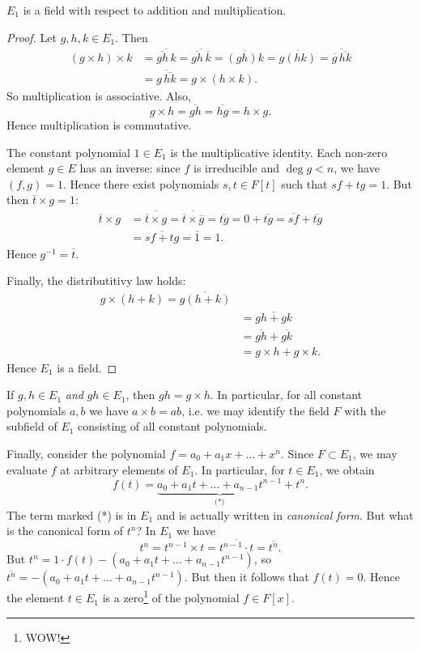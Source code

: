 \begin{proposition}
	$E_1$ is a field with respect to addition and multiplication.
	\begin{proof}
		Let $g, h, k \in E_1$. Then
		\begin{align*}
			(g \times h) \times k &= \overline{\overline{gh}\,k} = \overline{\overline{gh}\,\overline{k}} = \overline{(gh)k} = \overline{g(hk)} = \overline{\overline{g}\,\overline{hk}} \\
					&= \overline{g\,\overline{hk}} = g \times (h \times k).
		\end{align*}
		So multiplication is associative. Also,
		\[
			g \times h = \overline{gh} = \overline{hg} = h \times g.
		\]
		Hence multiplication is commutative.
		
		The constant polynomial $1 \in E_1$ is the multiplicative identity. Each non-zero element $g \in E$ has an inverse: since $f$ is irreducible and $\deg{g} < n$, we have $(f, g) = 1$. Hence there exist polynomials $s, t \in F[t]$ such that $sf + tg = 1$. But then $\overline{t} \times g = 1$:
		\begin{align*}
			\overline{t} \times g &= \overline{\overline{t} \times g} = \overline{\overline{t} \times \overline{g}} = \overline{tg} = 0 + \overline{tg} = \overline{sf} + \overline{tg} \\
					&= \overline{sf + tg} = \overline{1} = 1.
		\end{align*}
		Hence $g^{-1} = \overline{t}$.
		
		Finally, the distributitivy law holds:
		\begin{align*}
			g \times (h + k) = \overline{g(h + k)} \\
					&= \overline{gh + gk} \\
					&= \overline{gh} + \overline{gk} \\
					&= g \times h + g \times k.
		\end{align*}
		Hence $E_1$ is a field.
	\end{proof}
\end{proposition}

\begin{note}
	If $g, h \in E_1$ \emph{and} $gh \in E_1$, then $gh = g \times h$. In particular, for all constant polynomials $a, b$ we have $a \times b = ab$, i.e. we may identify the field $F$ with the subfield of $E_1$ consisting of all constant polynomials.
\end{note}

Finally, consider the polynomial $f = a_0 + a_1 x + \dots + x^n$. Since $F \subset E_1$, we may evaluate $f$ at arbitrary elements of $E_1$. In particular, for $t \in E_1$, we obtain
\[
	f(t) = \underbrace{a_0 + a_1 t + \dots + a_{n - 1} t^{n - 1}}_{\text{(*)}} + t^n.
\]
The term marked (*) is in $E_1$ and is actually written in \emph{canonical form}. But what is the canonical form of $t^n$? In $E_1$ we have
\[
	t^n = t^{n - 1} \times t = \overline{t^{n - 1} \cdot t} = \overline{t^n}.
\]
But $t^n = 1 \cdot f(t) - (a_0 + a_1 t + \dots + a_{n - 1} t^{n - 1})$, so $\overline{t^n} = -(a_0 + a_1 t + \dots + a_{n - 1} t^{n - 1})$. But then it follows that $f(t) = 0$. Hence the element $t \in E_1$ is a zero\footnote{WOW!} of the polynomial $f \in F[x]$.

